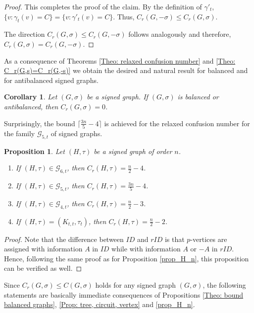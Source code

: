 \documentclass[a4paper,11pt]{article}
\newtheorem{prop}[defi]{Proposition}
\newtheorem{cor}[defi]{Corollary}
\theoremstyle{remark}
\begin{document}
\begin{proof}
This completes the proof of the claim. 
By the definition of $\gamma'_t$, $\{v \colon \gamma_t(v) = C\} = \{v \colon \gamma'_t(v) = C\}$.
Thus, $C_r(G,-\sigma) \leq C_r(G,\sigma)$. 

The direction $C_r(G,\sigma) \leq C_r(G,-\sigma)$ follows 
analogously and therefore, $C_r(G,\sigma) = C_r(G,-\sigma)$.
\end{proof}


As a consequence of Theorems \ref{Theo: relaxed confusion number} 
and \ref{Theo: C_r(G,s)=C_r(G,-s)} we obtain the 
desired and natural result for balanced and for antibalanced signed graphs. 

\begin{cor}\label{Cor: bound balanced graphs}
    Let $(G,\sigma)$ be a signed graph. If $(G,\sigma)$ is balanced
    or antibalanced, then $C_r(G,\sigma) = 0$.
\end{cor}


Surprisingly, the bound $\lceil \frac{3n}{5}-4 \rceil$ is achieved for the relaxed confusion number for the family $\mathcal{G}_{5,t}$ of signed graphs. 


\begin{prop}\label{prop_relaxed-H_n}
Let $(H,\tau)$ be a signed graph of order $n$.
\begin{enumerate}
    \item If $(H,\tau)\in\mathcal{G}_{6,t}$, then $C_r(H,\tau) =  \frac{n}{2}-4$.
    \item If $(H,\tau)\in\mathcal{G}_{5,t}$, then $C_r(H,\tau) =  \frac{3n}{5}-4$.
    \item If $(H,\tau)\in\mathcal{G}_{4,t}$, then $C_r(H,\tau) =  \frac{n}{2}-3$.
    \item If $(H,\tau)=(K_{t,t},\tau_t)$, then $C_r(H,\tau) =  \frac{n}{2}-2$. 
\end{enumerate}
\end{prop}

\begin{proof}
    Note that the difference between $ID$ and $rID$ is that $p$-vertices are assigned with information $A$ in $ID$ while with information $A$ or $-A$ in $rID$. Hence, following the same proof as for Proposition \ref{prop_H_n}, this proposition can be verified as well.
\end{proof}



Since $C_r(G,\sigma)\leq C(G,\sigma)$ holds for any signed graph $(G,\sigma)$, the following statements are basically immediate consequences of Propositions \ref{Theo: bound balanced graphs}, \ref{Prop: tree, circuit, vertex} and  \ref{prop_H_n}.
\end{document}
